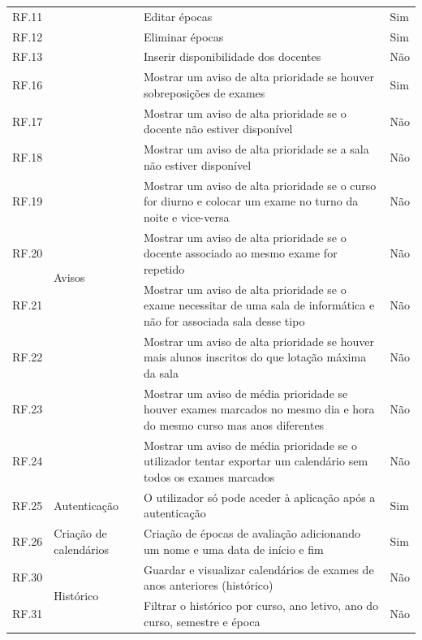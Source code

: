 \documentclass[12pt, twoside]{report}
\begin{document}
\begin{center}
\begin{longtable}{|m{1cm}|m{2.2cm}|m{9cm}|m{3cm}|}
			RF.11 && Editar épocas & Sim\\
			
			RF.12 && Eliminar épocas & Sim\\
			
			RF.13 && Inserir disponibilidade dos docentes & Não\\
			\hline
			
			RF.16 &\multirow{9}{2cm}{Avisos}& Mostrar um aviso de alta prioridade se houver sobreposições de exames & Sim\\
			
			RF.17 && Mostrar um aviso de alta prioridade se o docente não estiver disponível & Não \\
			
			RF.18 && Mostrar um aviso de alta prioridade se a sala não estiver disponível & Não\\
			
			RF.19 && Mostrar um aviso de alta prioridade se o curso for diurno e colocar um exame no turno da noite e vice-versa & Não\\
			
			RF.20&&Mostrar um aviso de alta prioridade se o docente associado ao mesmo exame for repetido & Não \\
			
			RF.21 && Mostrar um aviso de alta prioridade se o exame necessitar de uma sala de informática e não for associada sala desse tipo & Não\\
			
			RF.22 && Mostrar um aviso de alta prioridade se houver mais alunos inscritos do que  lotação máxima da sala & Não\\
			
			RF.23 && Mostrar um aviso de média prioridade se houver exames marcados no mesmo dia e hora do mesmo curso mas anos diferentes & Não\\
			
			RF.24 && Mostrar um aviso de média prioridade se o utilizador tentar exportar um calendário sem todos os exames marcados & Não\\
			
			\hline
			
			RF.25 &Autenticação& O utilizador só pode aceder à aplicação após a autenticação & Sim\\
			\hline
			
			RF.26 &\multirow{1}{2cm}{Criação de calendários}& Criação de épocas de avaliação adicionando um nome e uma data de início e fim & Sim \\
			
			\hline
			RF.30 &\multirow{2}{*}{Histórico}& Guardar e visualizar calendários de exames de anos anteriores (histórico)& Não \\
			
			RF.31 && Filtrar o histórico por curso, ano letivo, ano do curso, semestre e época& Não \\
			\hline
		\end{longtable}
	\end{center}
	
\end{document}

